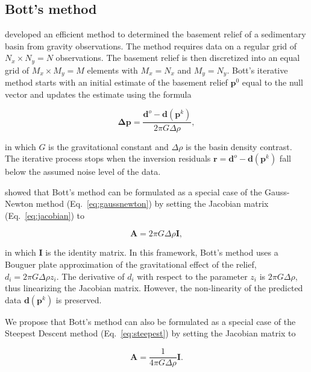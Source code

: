 \documentclass[extra,mreferee]{gji}
\begin{document}
\subsection{Bott's method}

\citet{bott1960} developed an efficient method to determined the basement
relief of a sedimentary basin from gravity observations.
The method requires data on a regular grid of $N_x \times N_y = N$
observations.
The basement relief is then discretized into an equal grid of $M_x \times
M_y = M$ elements with $M_x = N_x$ and $M_y = N_y$.
Bott's iterative method starts with an initial estimate of the basement relief
$\mathbf{p}^0$ equal to the null vector and updates the estimate using the formula

\begin{equation}
    \mathbf{\Delta p} = \dfrac{\mathbf{d}^o - \mathbf{d}(\mathbf{p}^k)}{2\pi G \Delta \rho},
    \label{eq:bott}
\end{equation}

\noindent
in which $G$ is the gravitational constant and $\Delta \rho$ is the basin
density contrast.
The iterative process stops when the inversion residuals
$\mathbf{r} = \mathbf{d}^o - \mathbf{d}(\mathbf{p}^k)$ fall below the assumed noise level
of the data.

\citet{silva2014} showed that Bott's method can be formulated as
a special case of the Gauss-Newton method (Eq.~\ref{eq:gaussnewton})
by setting the Jacobian matrix (Eq.~\ref{eq:jacobian}) to

\begin{equation}
    \mathbf{A} = 2\pi G \Delta \rho \mathbf{I},
    \label{eq:bott-gaussnewton}
\end{equation}

\noindent
in which $\mathbf{I}$ is the identity matrix.
In this framework,
Bott's method uses a Bouguer plate approximation of the gravitational effect of
the relief, $d_i = 2\pi G \Delta\rho z_i$.
The derivative of $d_i$ with respect to the parameter $z_i$ is
$2\pi G \Delta \rho$, thus linearizing the Jacobian matrix.
However, the non-linearity of the predicted data $\mathbf{d}(\mathbf{p}^k)$ is
preserved.

We propose that Bott's method can also be formulated as a special case of the
Steepest Descent method (Eq.~\ref{eq:steepest}) by setting the Jacobian matrix to

\begin{equation}
    \mathbf{A} = \dfrac{1}{4 \pi G \Delta \rho}\mathbf{I}.
    \label{eq:bott-steepest}
\end{equation}
\end{document}

